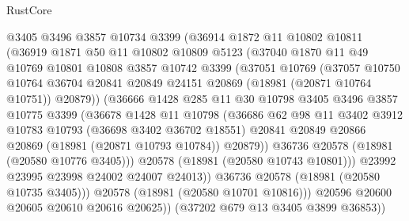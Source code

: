 \begin{lexlean}{RustCore}
\begin{coremodule}
              @3405
              @3496
              @3857
              @10734
              @3399
              (@36914
                @1872
                @11
                @10802
                @10811
                (@36919
                  @1871
                  @50
                  @11
                  @10802
                  @10809
                  @5123
                  (@37040
                    @1870
                    @11
                    @49
                    @10769
                    @10801
                    @10808
                    @3857
                    @10742
                    @3399
                    (@37051
                      @10769
                      (@37057
                        @10750
                        @10764
                        @36704
                        @20841
                        @20849
                        @24151
                        @20869
                        (@18981 (@20871 @10764 @10751))
                        @20879))
                    (@36666
                      @1428
                      @285
                      @11
                      @30
                      @10798
                      @3405
                      @3496
                      @3857
                      @10775
                      @3399
                      (@36678
                        @1428
                        @11
                        @10798
                        (@36686
                          @62
                          @98
                          @11
                          @3402
                          @3912
                          @10783
                          @10793
                          (@36698 @3402 @36702 @18551)
                          @20841
                          @20849
                          @20866
                          @20869
                          (@18981 (@20871 @10793 @10784))
                          @20879))
                      @36736
                      @20578
                      (@18981 (@20580 @10776 @3405)))
                    @20578
                    (@18981 (@20580 @10743 @10801)))
                  @23992
                  @23995
                  @23998
                  @24002
                  @24007
                  @24013))
              @36736
              @20578
              (@18981 (@20580 @10735 @3405)))
            @20578
            (@18981 (@20580 @10701 @10816)))
          @20596
          @20600
          @20605
          @20610
          @20616
          @20625))
      (@37202 @679 @13 @3405 @3899 @36853))

\end{coremodule}
\end{lexlean}
